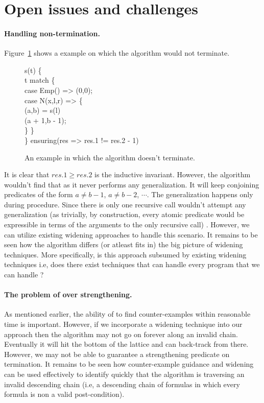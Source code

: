 \section{Open issues and challenges}

\paragraph{Handling non-termination.}

Figure~\ref{fig:eg3} shows a example on which the algorithm would not terminate.
%
\begin{figure}
\begin{myprogram}
s(t) \{ \\
\pnl \> t match \{ \\
\pnl \> case Emp() => (0,0); \\
\pnl \> case N(x,l,r) => \{ \\
\pnl \> \> (a,b) = s(l) \\
\pnl \> \> (a + 1,b - 1); \\
	 \> \> \}
\> \} \\
\} ensuring(res => res.1 != res.2 - 1)
\end{myprogram}
\caption{An example in which the algorithm doesn't terminate.} \label{fig:eg3}
\end{figure}
%
It is clear that $res.1 \ge res.2$ is the inductive invariant. However, the algorithm wouldn't 
find that as it never performs any generalization. It will keep conjoining predicates of the 
form $a \ne b -1$, $a \ne b - 2$, $\cdots$.  The generalization happens only during \SG procedure.
Since there is only one recursive call \SG wouldn't attempt any generalization (as trivially,
by construction, every atomic predicate would be expressible in terms of the arguments to the only 
recursive call) . 
However, we can utilize existing widening approaches to handle this scenario. 
It remains to be seen how the \IndGen algorithm differs (or atleast fits in)
the big picture of widening techniques. More specifically, is this approach subsumed
by existing widening techniques i.e, does there exist techniques that can handle every 
program that we can handle ? 

\paragraph{The problem of over strengthening.}

As mentioned earlier, the ability of \SDecide to find counter-examples within reasonable time is
important. However, if we incorporate a widening technique into our approach then the algorithm
may not go on forever along an invalid chain. Eventually it will hit the bottom of the 
lattice and can back-track from there. 
However, we may not be able to guarantee a strengthening predicate on termination.
It remains to be seen how counter-example guidance and widening can be used effectively to
identify quickly that the algorithm is traversing an invalid descending chain (i.e, a descending 
chain of formulas in which every formula is non a valid post-condition).

